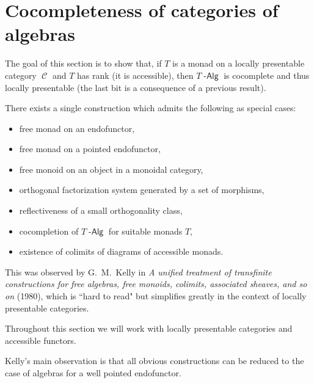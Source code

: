 \documentclass[a4paper,11pt,oneside,openany]{scrbook}
\DeclareMathOperator{\Alg}{-\mathsf{Alg}}
\DeclareMathOperator{\C}{\mathcal{C}}
\theoremstyle{definition}
\theoremstyle{definition}
\begin{document}
\section{Cocompleteness of categories of algebras}
The goal of this section is to show that, if $T$ is a monad on a locally presentable category $\C$ and $T$ has rank (it is accessible), then $T\Alg$ is cocomplete and thus locally presentable (the last bit is a consequence of a previous result).

There exists a single construction which admits the following as special cases:
\begin{itemize}
	\item free monad on an endofunctor,
	\item free monad on a pointed endofunctor,
	\item free monoid on an object in a monoidal category,
	\item orthogonal factorization system generated by a set of morphisms,
	\item reflectiveness of a small orthogonality class,
	\item cocompletion of $T\Alg$ for suitable monads $T$,
	\item existence of colimits of diagrams of accessible monads.
\end{itemize}
This was observed by G.\ M.\ Kelly in \emph{A unified treatment of transfinite constructions for free algebras, free monoids, colimits, associated sheaves, and so on} (1980), which is ``hard to read" but simplifies greatly in the context of locally presentable categories.

Throughout this section we will work with locally presentable categories and accessible functors.

Kelly's main observation is that all obvious constructions can be reduced to the case of algebras for a well pointed endofunctor.
\end{document}
